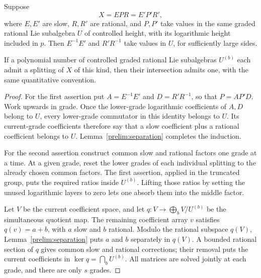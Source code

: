 \begin{lemma}
\label{prelim:symbol-splitting}
Suppose
\[
 X=EPR=E'P'R',
\]
where $E,E'$ are slow, $R,R'$ are rational, and $P,P'$ take values
in the same graded rational Lie subalgebra $U$ of controlled height,
with its logarithmic height included in $p$.  Then $E^{-1}E'$
and $R'R^{-1}$ take values in $U$, for sufficiently large sides.

If a polynomial number of controlled graded rational Lie subalgebras
$U^{(b)}$ each admit a splitting of $X$ of this kind, then their
intersection admits one, with the same quantitative convention.
\end{lemma}

\begin{proof}
For the first assertion put $A=E^{-1}E'$ and $D=R'R^{-1}$, so that
$P=AP'D$.  Work upwards in grade.  Once the lower-grade logarithmic
coefficients of $A,D$ belong to $U$, every lower-grade commutator in
this identity belongs to $U$.  Its current-grade coefficients therefore
say that a slow coefficient plus a rational coefficient belongs to
$U$.  Lemma~\ref{prelim:separation} completes the induction.

For the second assertion construct common slow and rational factors
one grade at a time.  At a given grade, reset the lower grades of each
individual splitting to the already chosen common factors.  The first
assertion, applied in the truncated group, puts the required ratios
inside $U^{(b)}$.  Lifting those ratios by setting the unused logarithmic
layers to zero lets one absorb them into the middle factor.

Let $V$ be the current coefficient space, and let
$q:V\to\bigoplus_b V/U^{(b)}$ be the simultaneous quotient map.
The remaining coefficient array $v$ satisfies $q(v)=a+b$, with
$a$ slow and $b$ rational.  Modulo the rational subspace $q(V)$,
Lemma~\ref{prelim:separation} puts $a$ and $b$ separately in $q(V)$.
A bounded rational section of $q$ gives common slow and rational
corrections; their removal puts the current coefficients in
$\ker q=\bigcap_bU^{(b)}$.  All matrices are solved jointly at each
grade, and there are only $s$ grades.
\end{proof}

